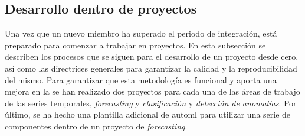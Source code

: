\subsection{Desarrollo dentro de proyectos}
Una vez que un nuevo miembro ha superado el periodo de integración,
está preparado para comenzar a trabajar en proyectos. En esta subsección
se describen los procesos que se siguen para el desarrollo de un
proyecto desde cero, así como las directrices generales para
garantizar la calidad y la reproducibilidad del mismo. Para garantizar 
que esta metodología es funcional y aporta una mejora en la
se han realizado dos proyectos para cada una de las áreas de
trabajo de las series temporales, \textit{forecasting} y \textit{clasificación}
y \textit{detección de anomalías}. Por último, se ha hecho una plantilla
adicional de automl para utilizar una serie de componentes dentro de 
un proyecto de \textit{forecasting}.

